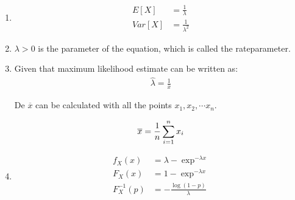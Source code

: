 \documentclass[a4paper,12px]{article}
\begin{document}
\begin{enumerate}
    \item
        \begin{equation}
        \begin{aligned}
            E[X] &= \frac{1}{\lambda}\\
            Var[X] &= \frac{1}{\lambda^2}
        \end{aligned}
        \end{equation}

    \item $\lambda > 0$ is the parameter of the equation, which is called the
        rateparameter.

    \item Given that maximum likelihood estimate can be written as:
        \begin{equation}
        \begin{aligned}
            \widehat{\lambda} = \frac{1}{\overline{x}}
        \end{aligned}
        \end{equation}

        De $\overline{x}$ can be calculated with all the points $x_1, x_2,
        \cdots x_n$.

        \begin{equation}
        \begin{aligned}
            \overline{x}={1 \over n}\sum_{i=1}^n x_i
        \end{aligned}
        \end{equation}

    \item
        \begin{equation}
        \begin{aligned}
            f_X(x) &= \lambda - \exp^{-\lambda x}\\
            F_X(x) &= 1 - \exp^{-\lambda x}\\
            F^{-1}_X(p) &= -\frac{\log{(1-p)}}{\lambda}\\
        \end{aligned}
        \end{equation}


\end{enumerate}
\end{document}
